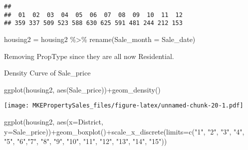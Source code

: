\documentclass[
]{article}
\newenvironment{Shaded}{\begin{snugshade}}{\end{snugshade}}
\newcommand{\AttributeTok}[1]{\textcolor[rgb]{0.77,0.63,0.00}{#1}}
\newcommand{\ConstantTok}[1]{\textcolor[rgb]{0.00,0.00,0.00}{#1}}
\newcommand{\FunctionTok}[1]{\textcolor[rgb]{0.00,0.00,0.00}{#1}}
\newcommand{\NormalTok}[1]{#1}
\newcommand{\OtherTok}[1]{\textcolor[rgb]{0.56,0.35,0.01}{#1}}
\newcommand{\SpecialCharTok}[1]{\textcolor[rgb]{0.00,0.00,0.00}{#1}}
\newcommand{\StringTok}[1]{\textcolor[rgb]{0.31,0.60,0.02}{#1}}
\begin{document}
\begin{Shaded}
\end{Shaded}

\begin{verbatim}
## 
##  01  02  03  04  05  06  07  08  09  10  11  12 
## 359 337 509 523 588 630 625 591 481 244 212 153
\end{verbatim}

\begin{Shaded}
\begin{Highlighting}[]
\NormalTok{housing2 }\OtherTok{=}\NormalTok{ housing2 }\SpecialCharTok{\%\textgreater{}\%} \FunctionTok{rename}\NormalTok{(}\AttributeTok{Sale\_month =}\NormalTok{ Sale\_date)}
\end{Highlighting}
\end{Shaded}

Removing PropType since they are all now Residential.

\begin{Shaded}
\end{Shaded}

Density Curve of Sale\_price

\begin{Shaded}
\begin{Highlighting}[]
\FunctionTok{ggplot}\NormalTok{(housing2, }\FunctionTok{aes}\NormalTok{(Sale\_price))}\SpecialCharTok{+}\FunctionTok{geom\_density}\NormalTok{()}
\end{Highlighting}
\end{Shaded}

\texttt{[image: MKEPropertySales\_files/figure-latex/unnamed-chunk-20-1.pdf]}

\begin{Shaded}
\begin{Highlighting}[]
\FunctionTok{ggplot}\NormalTok{(housing2, }\FunctionTok{aes}\NormalTok{(}\AttributeTok{x=}\NormalTok{District, }\AttributeTok{y=}\NormalTok{Sale\_price))}\SpecialCharTok{+}\FunctionTok{geom\_boxplot}\NormalTok{()}\SpecialCharTok{+}\FunctionTok{scale\_x\_discrete}\NormalTok{(}\AttributeTok{limits=}\FunctionTok{c}\NormalTok{(}\StringTok{"1"}\NormalTok{, }\StringTok{"2"}\NormalTok{, }\StringTok{"3"}\NormalTok{, }\StringTok{"4"}\NormalTok{, }\StringTok{"5"}\NormalTok{, }\StringTok{"6"}\NormalTok{,}\StringTok{"7"}\NormalTok{, }\StringTok{"8"}\NormalTok{, }\StringTok{"9"}\NormalTok{, }\StringTok{"10"}\NormalTok{, }\StringTok{"11"}\NormalTok{, }\StringTok{"12"}\NormalTok{, }\StringTok{"13"}\NormalTok{, }\StringTok{"14"}\NormalTok{, }\StringTok{"15"}\NormalTok{))}
\end{Highlighting}
\end{Shaded}
\end{document}
